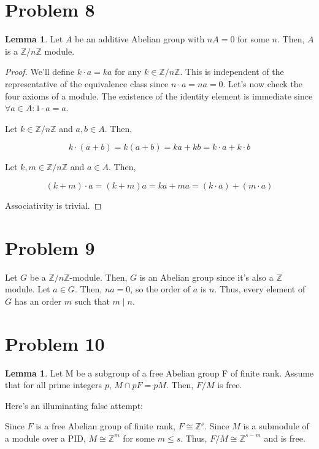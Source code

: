 \documentclass{article}
\theoremstyle{definition}
\newtheorem{lemma}[theorem]{Lemma}
\newcommand{\Z}{\mathbb{Z}}
\begin{document}
\section{Problem 8}

\begin{lemma}
    Let $A$ be an additive Abelian group with $nA = 0$ for some $n$. Then, $A$ is a $\Z/n\Z$ module.
\end{lemma}
\begin{proof}
    We'll define $k \cdot a = ka$ for any $k \in \Z/n\Z$. This is independent of the representative of the equivalence class since $n \cdot a = na = 0$. Let's now check the four axioms of a module. The existence of the identity element is immediate since $\forall a \in A: 1 \cdot a = a$.

    Let $k \in \Z/n\Z$ and $a,b \in A$. Then,

    \[ k \cdot (a + b) = k(a+b) = ka + kb = k \cdot a + k \cdot b\]

    Let $k,m \in \Z/n\Z$ and $a \in A$. Then,

    \[ (k + m) \cdot a = (k + m)a = ka + ma = (k \cdot a) + (m \cdot a)\]

    Associativity is trivial.
\end{proof}

\section{Problem 9}

Let $G$ be a $\Z/n\Z$-module. Then, $G$ is an Abelian group since it's also a $\Z$ module. Let $a \in G$. Then, $na = 0$, so the order of $a$ is $n$. Thus, every element of $G$ has an order $m$ such that $m \mid n$.

\section{Problem 10}

\begin{lemma}
    Let M be a subgroup of a free Abelian group F of finite rank. Assume that for all prime integers $p$, $M \cap pF = pM$. Then, $F/M$ is free.
\end{lemma}

Here's an illuminating false attempt:

Since $F$ is a free Abelian group of finite rank, $F \cong \Z^{s}$.
Since $M$ is a submodule of a module over a PID, $M \cong \Z^{m}$ for some $m \leq s$.
Thus, $F/M \cong \Z^{s-m}$ and is free.
\end{document}
